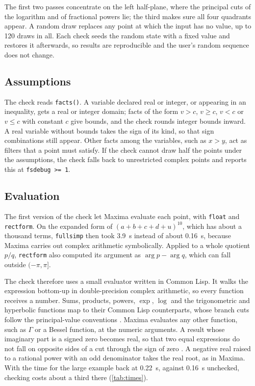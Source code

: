 \documentclass[11pt]{amsart}
\newcommand{\mx}{\lstinline[style=mx]}
\theoremstyle{definition}
\theoremstyle{remark}
\begin{document}
The first two passes concentrate on the left half-plane, where the
principal cuts of the logarithm and of fractional powers lie; the third
makes sure all four quadrants appear. A random draw replaces any point at
which the input has no value, up to 120 draws in all. Each check seeds the
random state with a fixed value and restores it afterwards, so results are
reproducible and the user's random sequence does not change.

\subsection{Assumptions}

The check reads \mx|facts()|. A variable declared real or integer, or
appearing in an inequality, gets a real or integer domain; facts of the form
$v > c$, $v \ge c$, $v < c$ or $v \le c$ with constant $c$ give bounds, and
the check rounds integer bounds inward. A real variable without bounds takes
the sign of its kind, so that sign combinations still appear. Other facts
among the variables, such as $x > y$, act as filters that a point must
satisfy. If the check cannot draw half the points under the assumptions,
the check falls back to unrestricted complex points and reports this at
\mx|fsdebug >= 1|.

\subsection{Evaluation}

The first version of the check let Maxima evaluate each point, with
\mx|float| and \mx|rectform|. On the expanded form of $(a+b+c+d+u)^{10}$, which
has about a thousand terms, \mx|fullsimp| then took 3.9~s instead of about
0.16~s, because Maxima carries out complex arithmetic symbolically. Applied to a whole
quotient $p/q$, \mx|rectform| also computed its argument as
$\arg p - \arg q$, which can fall outside $(-\pi, \pi]$.

The check therefore uses a small evaluator written in Common Lisp. It walks
the expression bottom-up in double-precision complex arithmetic, so every
function receives a number. Sums, products, powers, $\exp$, $\log$ and the
trigonometric and hyperbolic functions map to their Common Lisp
counterparts, whose branch cuts follow the principal-value conventions
\cite{Steele90}. Maxima evaluates any other function, such as $\Gamma$ or a
Bessel function, at the numeric arguments. A result whose imaginary part
is a signed zero becomes real, so that two equal expressions do not fall on
opposite sides of a cut through the sign of zero \cite{Kahan87}. A
negative real raised to a rational power with an odd denominator takes the
real root, as in Maxima. With the time for the large example back at 0.22~s,
against 0.16~s unchecked, checking costs about a third there (\cref{tab:times}).
\end{document}
